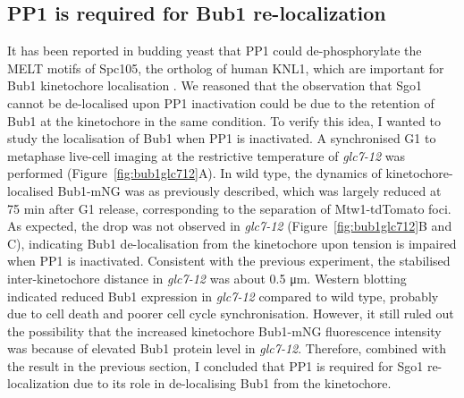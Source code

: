 \subsection{PP1 is required for Bub1 re-localization}

 It has been reported in budding yeast that PP1 could de-phosphorylate the MELT motifs of Spc105, the ortholog of human KNL1, which are important for Bub1 kinetochore localisation \citep{London2012, Roy2019}. We reasoned that the observation that Sgo1 cannot be de-localised upon PP1 inactivation could be due to the retention of Bub1 at the kinetochore in the same condition. To verify this idea, I wanted to study the localisation of Bub1 when PP1 is inactivated. A synchronised G1 to metaphase live-cell imaging at the restrictive temperature of \textit{glc7-12} was performed (Figure~\ref{fig:bub1glc712}A). In wild type, the dynamics of kinetochore-localised Bub1-mNG was as previously described, which was largely reduced at 75 \si{\minute} after G1 release, corresponding to the separation of Mtw1-tdTomato foci. As expected, the drop was not observed in \textit{glc7-12} (Figure~\ref{fig:bub1glc712}B and C), indicating Bub1 de-localisation from the kinetochore upon tension is impaired when PP1 is inactivated. Consistent with the previous experiment, the stabilised inter-kinetochore distance in \textit{glc7-12} was about 0.5 \si{\micro\metre}. Western blotting indicated reduced Bub1 expression in \textit{glc7-12} compared to wild type, probably due to cell death and poorer cell cycle synchronisation. However, it still ruled out the possibility that the increased kinetochore Bub1-mNG fluorescence intensity was because of elevated Bub1 protein level in \textit{glc7-12}. Therefore, combined with the result in the previous section, I concluded that PP1 is required for Sgo1 re-localization due to its role in de-localising Bub1 from the kinetochore. 

